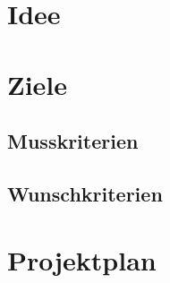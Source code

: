 \documentclass[parskip=full]{scrartcl}
\begin{document}
	\section{Idee}
	
	\section{Ziele}
		\subsection{Musskriterien}
		
		\subsection{Wunschkriterien}
	
	\section{Projektplan}

				
\end{document}
